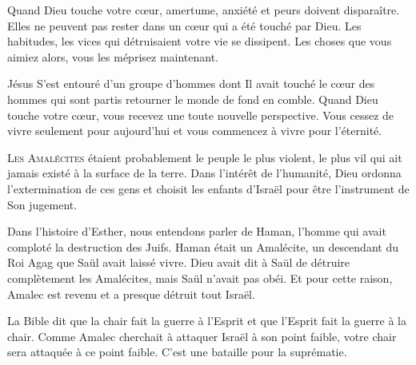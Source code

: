 Quand Dieu touche votre c\oe{}ur, amertume, anxiété et peurs doivent disparaître.
 Elles ne peuvent pas rester dans un c\oe{}ur qui a été touché par Dieu.
 Les habitudes, les vices qui détruisaient votre vie se dissipent.
 Les choses que vous aimiez alors, vous les méprisez maintenant.


Jésus S'est entouré d'un groupe d'hommes dont Il avait touché le c\oe{}ur
 \ocadr des hommes qui sont partis retourner le monde de fond en comble.
 Quand Dieu touche votre c\oe{}ur, vous recevez une toute nouvelle perspective.
 Vous cessez de vivre seulement pour aujourd'hui et vous commencez
 à vivre pour l'éternité. 

\dvrule






\lettrine{L}{es Amalécites} étaient probablement le peuple le plus violent,
 le plus vil qui ait jamais existé à la surface de la terre.
 Dans l'intérêt de l'humanité, Dieu ordonna l'extermination de ces gens
 et choisit les enfants d'Israël pour être l'instrument de Son jugement.

Dans l'histoire d'Esther, nous entendons parler de Haman,
 l'homme qui avait comploté la destruction des Juifs.
 Haman était un Amalécite, un descendant du Roi Agag que Saül
 avait laissé vivre.
 Dieu avait dit à Saül de \Og détruire complètement \Fg{} les Amalécites,
 mais Saül n'avait pas obéi.
 Et pour cette raison, Amalec est revenu et a presque détruit tout Israël.

La Bible dit que la chair fait la guerre à l'Esprit et que l'Esprit
 fait la guerre à la chair.
 Comme Amalec cherchait à attaquer Israël à son point faible,
 votre chair sera attaquée à ce point faible.
 C'est une bataille pour la suprématie.


